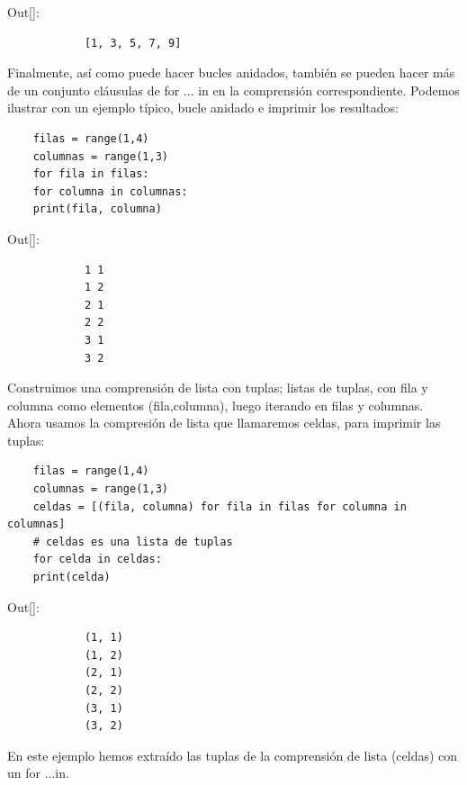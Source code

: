 {\ttfamily\scriptsize\scriptsize\noindent Out[]:\vspace{-0.3cm}	                   %
	{\color{blue}	
		\begin{verbatim}
			[1, 3, 5, 7, 9]
		\end{verbatim}
}}

Finalmente, así como puede hacer bucles anidados, también se pueden hacer más de un conjunto 
cláusulas de {\ttfamily for ... in}  en la comprensión correspondiente. Podemos ilustrar con un ejemplo típico, 
bucle anidado e imprimir los resultados:

\hspace{-2.3cm}{\ttfamily \scriptsize tipico.py}  \vspace{-0.5cm}
\begin{lstlisting}
	filas = range(1,4)
	columnas = range(1,3)			
	for fila in filas:
	for columna in columnas:
	print(fila, columna)
\end{lstlisting}
{\ttfamily\scriptsize\scriptsize 
	Out[]: \vspace{-0.3cm}	            %
	{\color{blue} 	
		\begin{verbatim}
			1 1
			1 2
			2 1
			2 2
			3 1
			3 2		
		\end{verbatim}
}}

Construimos una comprensión de lista con tuplas;  listas de tuplas, con fila y columna como elementos (fila,columna), luego iterando en filas y columnas. Ahora usamos la compresión  de lista que llamaremos celdas, para imprimir las tuplas:

\hspace{-2.3cm}{\ttfamily \scriptsize celdas.py}  \vspace{-0.5cm}
\begin{lstlisting}		
	filas = range(1,4)
	columnas = range(1,3)
	celdas = [(fila, columna) for fila in filas for columna in columnas]
	# celdas es una lista de tuplas
	for celda in celdas:
	print(celda)
\end{lstlisting}
{\ttfamily\scriptsize\scriptsize 
	Out[]: \vspace{-0.3cm}	  %
	{\color{blue} 	
		\begin{verbatim}
			(1, 1)
			(1, 2)
			(2, 1)
			(2, 2)
			(3, 1)
			(3, 2)	
		\end{verbatim}
}}
\noindent En este ejemplo hemos extraído las tuplas de la comprensión de lista (celdas) con un {\ttfamily for ...in}.\\


